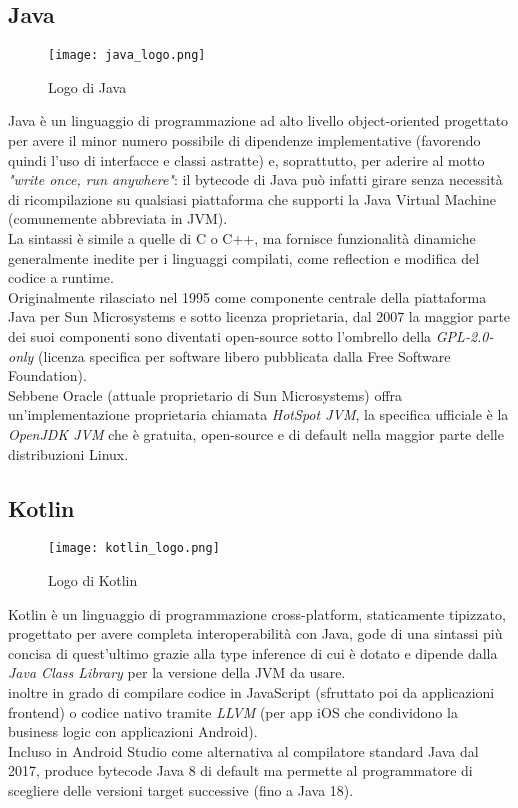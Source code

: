 \subsection{Java}
\begin{figure}[ht]
    \centering
    \texttt{[image: java\_logo.png]}
    \caption{Logo di Java}
\end{figure} \aCapo{}
Java è un linguaggio di programmazione ad alto livello object-oriented progettato per avere il minor numero possibile di dipendenze implementative (favorendo quindi l'uso di interfacce e classi astratte) e, soprattutto, per aderire al motto \textit{"write once, run anywhere"}: il bytecode di Java può infatti girare senza necessità di ricompilazione su qualsiasi piattaforma che supporti la Java Virtual Machine (comunemente abbreviata in JVM).\\  
La sintassi è simile a quelle di C o C++, ma fornisce funzionalità dinamiche generalmente inedite per i linguaggi compilati, come reflection e modifica del codice a runtime.\\
Originalmente rilasciato nel 1995 come componente centrale della piattaforma Java per Sun Microsystems e sotto licenza proprietaria, dal 2007 la maggior parte dei suoi componenti sono diventati open-source sotto l'ombrello della \textit{GPL-2.0-only} (licenza specifica per software libero pubblicata dalla Free Software Foundation).\\
Sebbene Oracle (attuale proprietario di Sun Microsystems) offra un'implementazione proprietaria chiamata \textit{HotSpot JVM}, la specifica ufficiale è la \textit{OpenJDK JVM} che è gratuita, open-source e di default nella maggior parte delle distribuzioni Linux.

\subsection{Kotlin}
\begin{figure}[ht]
    \centering
    \texttt{[image: kotlin\_logo.png]}
    \caption{Logo di Kotlin}
\end{figure} \aCapo{}
Kotlin è un linguaggio di programmazione cross-platform, staticamente tipizzato, progettato per avere completa interoperabilità con Java, gode di una sintassi più concisa di quest'ultimo grazie alla type inference di cui è dotato e dipende dalla \textit{Java Class Library} per la versione della JVM da usare.\\
\E{} inoltre in grado di compilare codice in JavaScript (sfruttato poi da applicazioni frontend) o codice nativo tramite \textit{LLVM} (per app iOS che condividono la business logic con applicazioni Android).\\
Incluso in Android Studio come alternativa al compilatore standard Java dal 2017, produce bytecode Java 8 di default ma permette al programmatore di scegliere delle versioni target successive (fino a Java 18).

